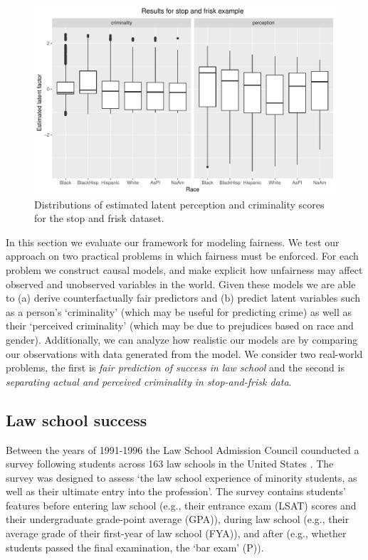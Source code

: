 \begin{figure}[th]
\begin{center}
\vspace{-1ex}
\centerline{\includegraphics[width=\columnwidth]{stopandfrisk_output.pdf}}
\vspace{-2ex}
\caption{Distributions of estimated latent perception and criminality scores for the stop and frisk dataset.\label{figure.stop_and_frisk_output}}
\vspace{-2ex}
\end{center}
\end{figure}

In this section we evaluate our framework for modeling fairness. We test our approach on two practical problems in which fairness must be enforced. For each problem we construct causal models, and make explicit how unfairness may affect observed and unobserved variables in the world. Given these models we are able to (a) derive counterfactually fair predictors and (b) predict latent variables such as a person's `criminality' (which may be useful for predicting crime) as well as their `perceived criminality' (which may be due to prejudices based on race and gender). Additionally, we can analyze how realistic our models are by comparing our observations with data generated from the model. We consider two real-world problems, the first is \emph{fair prediction of success in law school} and the second is \emph{separating actual and perceived criminality in stop-and-frisk data}.

\subsection{Law school success}
Between the years of 1991-1996 the Law School Admission Council counducted a survey following students across 163 law schools in the United States \cite{wightman1998lsac}. The survey was designed to assess `the law school experience of minority students, as well as their ultimate entry into the profession'. The survey contains students' features before entering law school (e.g., their entrance exam (LSAT) scores and their undergraduate grade-point average (GPA)), during law school (e.g., their average grade of their first-year of law school (FYA)), and after (e.g., whether students passed the final examination, the `bar exam' (P)). 

